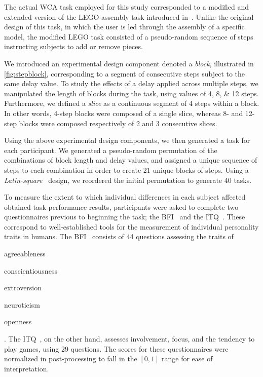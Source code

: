 The actual \gls{WCA} task employed for this study corresponded to a modified and extended version of the LEGO assembly task introduced in~\cite{chen2015early}.
Unlike the original design of this task, in which the user is led through the assembly of a specific model, the modified LEGO task consisted of a pseudo-random sequence of steps instructing subjects to add or remove pieces.

We introduced an experimental design component denoted a \emph{block}, illustrated in \cref{fig:stepblock}, corresponding to a segment of consecutive steps subject to the same delay value.
To study the effects of a delay applied across multiple steps, we manipulated the length of blocks during the task, using values of \numlist[list-final-separator={, or }]{4;8;12} steps.
Furthermore, we defined a \emph{slice} as a continuous segment of \num{4} steps within a block.
In other words, \num{4}-step blocks were composed of a single slice, whereas \num{8}- and \num{12}-step blocks were composed respectively of \num{2} and \num{3} consecutive slices.

Using the above experimental design components, we then generated a task for each participant.
We generated a pseudo-random permutation of the combinations of block length and delay values, and assigned a unique sequence of steps to each combination in order to create \num{21} unique blocks of steps.
Using a \emph{Latin-square}~\cite{keedwell2015latin} design, we reordered the initial permutation to generate \num{40} tasks.

To measure the extent to which individual differences in each subject affected obtained task-performance results, participants were asked to complete two questionnaires previous to beginning the task;
the \gls{BFI}~\cite{john1999big} and the \gls{ITQ}~\cite{witmer1998measuring}.
These correspond to well-established tools for the measurement of individual personality traits in humans.
The \gls{BFI}~\cite{john1999big} consists of \num{44} questions assessing the traits of
\begin{inlineenum}
    \item agreeableness
    \item conscientiousness
    \item extroversion
    \item neuroticism
    \item openness
\end{inlineenum}.
The \gls{ITQ}~\cite{witmer1998measuring}, on the other hand, assesses involvement, focus, and the tendency to play games, using \num{29} questions.
The scores for these questionnaires were normalized in post-processing to fall in the \ensuremath{[0, 1]} range for ease of interpretation.

